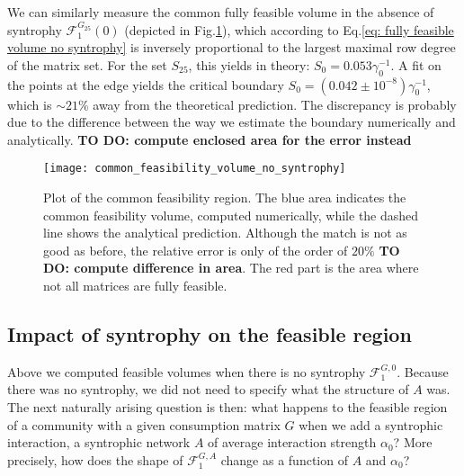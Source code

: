 \documentclass[12pt, titlepage]{report}
\begin{document}
We can similarly measure the common fully feasible volume in the absence of syntrophy $\mathcal{F}_1^{G_{25}}(0)$ (depicted in Fig.\ref{fig: common feasible volume no syntrophy}), which according to Eq.\eqref{eq: fully feasible volume no syntrophy} is inversely proportional to the largest maximal row degree of the matrix set. For the set $S_{25}$, this yields in theory: $S_0 = 0.053 \gamma_0^{-1}$. A fit on the points at the edge yields the critical boundary $S_0 = (0.042 \pm 10^{-8})\gamma_0^{-1}$, which is $\sim 21 \%$ away from the theoretical prediction. The discrepancy is probably due to the difference between the way we estimate the boundary numerically and analytically. \textbf{TO DO: compute enclosed area for the error instead}
\begin{figure}[h!]
\centering
\texttt{[image: common\_feasibility\_volume\_no\_syntrophy]}
\caption{Plot of the common feasibility region. The blue area indicates the common feasibility volume, computed numerically, while the dashed line shows the analytical prediction. Although the match is not as good as before, the relative error is only of the order of $20 \%$ \textbf{TO DO: compute difference in area}. The red part is the area where not all matrices are fully feasible.}
\label{fig: common feasible volume no syntrophy}
\end{figure}

\subsection{Impact of syntrophy on the feasible region}\label{sec: impact of syntrophy on feasible region}

Above we computed feasible volumes when there is no syntrophy \ie $\mathcal{F}^{G,0}_1$. Because there was no syntrophy, we did not need to specify what the structure of $A$ was. The next naturally arising question is then: what happens to the feasible region of a community with a given consumption matrix $G$ when we add a syntrophic interaction, \ie a syntrophic network $A$ of average interaction strength $\alpha_0$? More precisely, how does the shape of $\mathcal{F}^{G,A}_1$ change as a function of $A$ and $\alpha_0$?
\end{document}
